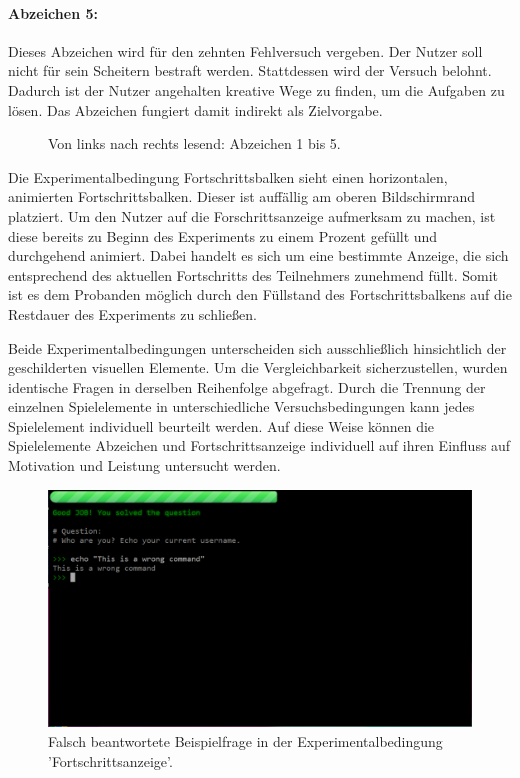 \paragraph{Abzeichen 5:}
Dieses Abzeichen wird für den zehnten Fehlversuch vergeben. Der Nutzer soll nicht für sein Scheitern bestraft werden. Stattdessen wird der Versuch belohnt. Dadurch ist der Nutzer angehalten kreative Wege zu finden, um die Aufgaben zu lösen. Das Abzeichen fungiert damit indirekt als Zielvorgabe.


\begin{figure}[htbp]
    \centering
    
    
    
    
    
    \caption{Von links nach rechts lesend: Abzeichen 1 bis 5.}
\end{figure}


Die Experimentalbedingung Fortschrittsbalken sieht einen horizontalen, animierten Fortschrittsbalken. Dieser ist auffällig am oberen Bildschirmrand platziert. Um den Nutzer auf die Forschrittsanzeige aufmerksam zu machen, ist diese bereits zu Beginn des Experiments zu einem Prozent gefüllt und durchgehend animiert. Dabei handelt es sich um eine bestimmte Anzeige, die sich entsprechend des aktuellen Fortschritts des Teilnehmers zunehmend füllt. Somit ist es dem Probanden möglich durch den Füllstand des Fortschrittsbalkens auf die Restdauer des Experiments zu schließen.

Beide Experimentalbedingungen unterscheiden sich ausschließlich hinsichtlich der geschilderten visuellen Elemente. Um die Vergleichbarkeit sicherzustellen, wurden identische Fragen in derselben Reihenfolge abgefragt. Durch die Trennung der einzelnen Spielelemente in unterschiedliche Versuchsbedingungen kann jedes Spielelement individuell beurteilt werden. Auf diese Weise können die Spielelemente Abzeichen und Fortschrittsanzeige individuell auf ihren Einfluss auf Motivation und Leistung untersucht werden.

\begin{figure}[htbp]
    \centering
    \includegraphics[width=\textwidth]{img/full_web.png}
    \caption{Falsch beantwortete Beispielfrage in der Experimentalbedingung 'Fortschrittsanzeige'.}
\end{figure}

